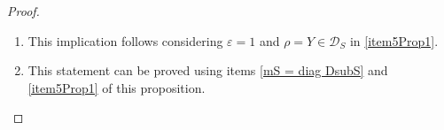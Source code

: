 \documentclass[10pt,a4paper]{amsart}
\def\calD{\mathcal D}
\begin{document}
\begin{proof}
\begin{enumerate}
	
	\item[\ref{item5Prop1} $\Rightarrow$ \ref{item4Prop1}.] This implication follows considering $\varepsilon=1$ and $\rho=Y\in\calD_S$ in \ref{item5Prop1}.
	
	\item[\ref{item6Prop1}.] This statement can be proved using items \ref{mS = diag DsubS} and \ref{item5Prop1} of this proposition.
\end{enumerate}
\end{proof}
\end{document}
